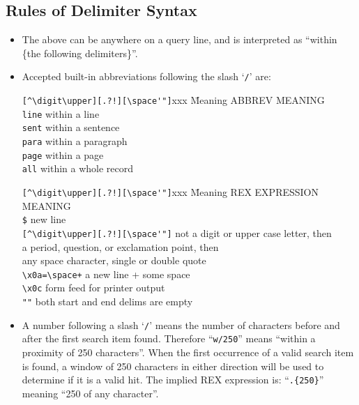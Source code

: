 \subsection{Rules of Delimiter Syntax}

\begin{itemize}

\item The above can be anywhere on a query line, and is interpreted as
``within \{the following delimiters\}''.

\item Accepted built-in abbreviations following the slash `\verb`/`'
are:

\begin{tabbing}
\verb`[^\digit\upper][.?!][\space'"]`xxx \= Meaning \kill
ABBREV       \> MEANING \\
\verb`line`  \> within a line \\
\verb`sent`  \> within a sentence \\
\verb`para`  \> within a paragraph \\
\verb`page`  \> within a page \\
\verb`all`   \> within a whole record
\end{tabbing}

\begin{tabbing}
\verb`[^\digit\upper][.?!][\space'"]`xxx \= Meaning \kill
REX EXPRESSION                           \> MEANING   \\
\verb`$`                                  new line      \\
\verb`[^\digit\upper][.?!][\space'"]`    \> not a digit or upper case letter, then \\
                                         \> a period, question, or exclamation point, then \\
                                         \> any space character, single or double quote  \\
\verb`\x0a=\space+`                      \> a new line + some space  \\
\verb`\x0c`                              \> form feed for printer output \\
\verb`""`                                \> both start and end delims are empty
\end{tabbing}

\item A number following a slash `\verb`/`' means the number of
characters before and after the first search item found.  Therefore
``\verb`w/250`'' means ``within a proximity of 250 characters''.  When
the first occurrence of a valid search item is found, a window of 250
characters in either direction will be used to determine if it is a
valid hit.  The implied REX expression is:  ``\verb`.{250}`''
meaning ``250 of any character''.


\end{itemize}
